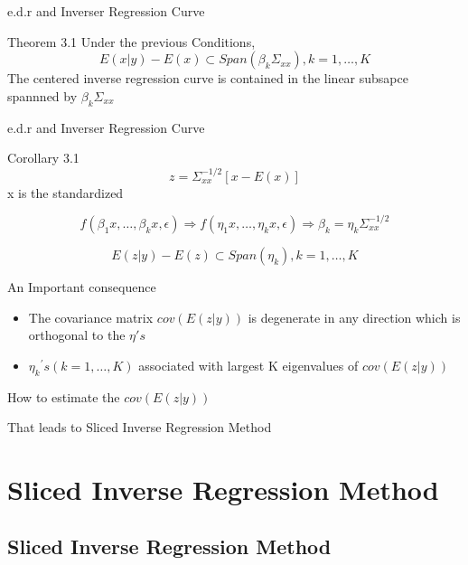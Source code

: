 \documentclass[ignorenonframetext,]{beamer}
\providecommand{\tightlist}{%
  \setlength{\itemsep}{0pt}\setlength{\parskip}{0pt}}
\begin{document}
\begin{frame}{e.d.r and Inverser Regression Curve}

\begin{block}{Theorem 3.1} 
Under the previous Conditions,
\[ E(x|y) - E(x) \subset Span(\beta_k\Sigma_{xx}),k = 1, \dots, K\]
The centered inverse regression curve is contained in the linear subsapce spannned by $\beta_k\Sigma_{xx}$
\end{block}

\end{frame}

\begin{frame}{e.d.r and Inverser Regression Curve}

\begin{block}{Corollary 3.1} 
\[ z = \Sigma_{xx}^{-1/2}[x-E(x)] \]
x is the standardized 

\[ f(\beta_1x, \dots, \beta_kx, \epsilon) \Rightarrow f(\eta_1x, \dots, \eta_kx, \epsilon) \Rightarrow \beta_k = \eta_k \Sigma_{xx}^{-1/2}\]

\[E(z|y) - E(z) \subset Span(\eta_k), k=1 ,\dots, K\]
\end{block}

\end{frame}

\begin{frame}{An Important consequence}

\begin{itemize}
\tightlist
\item
  The covariance matrix \(cov(E(z|y))\) is degenerate in any direction
  which is orthogonal to the \(\eta's\)
\item
  \({\eta_k}^{'}s( k =1, \dots, K)\) associated with largest K
  eigenvalues of \(cov(E(z|y))\)
\end{itemize}

\begin{block}{How to estimate the \(cov(E(z|y))\)}

That leads to Sliced Inverse Regression Method

\end{block}

\end{frame}

\section{Sliced Inverse Regression
Method}\label{sliced-inverse-regression-method}

\subsection{Sliced Inverse Regression
Method}\label{sliced-inverse-regression-method-1}
\end{document}
